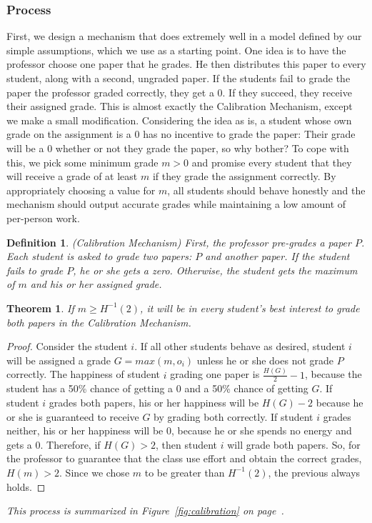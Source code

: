 \documentclass[12pt, Arial]{article}
\newtheorem{theorem}{Theorem}
\newtheorem{definition}{Definition}
\begin{document}
\subsubsection{Process}
First, we design a mechanism that does extremely well in a model defined by our simple assumptions, which we use as a starting point.
One idea is to have the professor choose one paper that he grades. He then distributes this paper to every student, along with a second, ungraded paper. If the students fail to grade the paper the professor graded correctly, they get a 0. If they succeed, they receive their assigned grade.
This is almost exactly the Calibration Mechanism, except we make a small modification. Considering the idea as is, a student whose own grade on the assignment is a 0 has no incentive to grade the paper: Their grade will be a 0 whether or not they grade the paper, so why bother? To cope with this, we pick some minimum grade $m > 0$ and promise every student that they will receive a grade of at least $m$ if they grade the assignment correctly.
By appropriately choosing a value for $m$, all students should behave honestly and the mechanism should output accurate grades while maintaining a low amount of per-person work.\\
\begin{definition}(Calibration Mechanism)
First, the professor pre-grades a paper $P$. Each student is asked to grade two papers: $P$ and another paper. If the student fails to grade $P$, he or she gets a zero. Otherwise, the student gets the maximum of $m$ and his or her assigned grade.
\end{definition}
\medskip
\begin{theorem}
If $m \geq H^{-1}(2)$, it will be in every student's best interest to grade both papers in the Calibration Mechanism.
\end{theorem}
\begin{proof}
Consider the student $i$.
If all other students behave as desired, student $i$ will be assigned a grade $G=max(m,o_i)$ unless he or she does not grade $P$ correctly.
The happiness of student $i$ grading one paper is $\frac{H(G)}{2}-1$, because the student has a 50\% chance of getting a 0 and a 50\% chance of getting $G$.
If student $i$ grades both papers, his or her happiness will be $H(G)-2$ because he or she is guaranteed to receive $G$ by grading both correctly.
If student $i$ grades neither, his or her happiness will be $0$, because he or she spends no energy and gets a 0.
Therefore, if $H(G) > 2$, then student $i$ will grade both papers. So, for the professor to guarantee that the class use effort and obtain the correct grades, $H(m) > 2$.
Since we chose $m$ to be greater than $H^{-1}(2)$, the previous always holds.
\end{proof}
\emph{This process is summarized in Figure~\ref{fig:calibration} on page~\pageref{fig:calibration}.}
\end{document}
